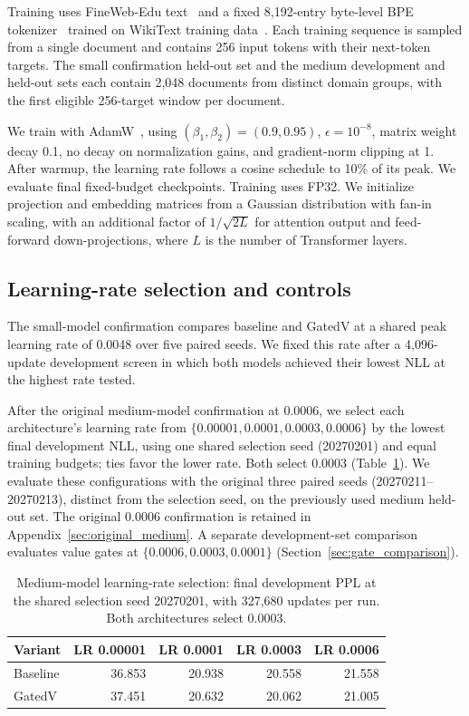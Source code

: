 \documentclass[11pt,a4paper]{article}
\begin{document}
Training uses FineWeb-Edu text~\citep{fineweb} and a fixed 8,192-entry byte-level BPE tokenizer~\citep{gpt2} trained on WikiText training data~\citep{wikitext}. Each training sequence is sampled from a single document and contains 256 input tokens with their next-token targets. The small confirmation held-out set and the medium development and held-out sets each contain 2,048 documents from distinct domain groups, with the first eligible 256-target window per document.

We train with AdamW~\citep{adamw}, using $(\beta_1,\beta_2)=(0.9,0.95)$, $\epsilon=10^{-8}$, matrix weight decay 0.1, no decay on normalization gains, and gradient-norm clipping at 1. After warmup, the learning rate follows a cosine schedule to 10\% of its peak. We evaluate final fixed-budget checkpoints. Training uses FP32. We initialize projection and embedding matrices from a Gaussian distribution with fan-in scaling, with an additional factor of $1/\sqrt{2L}$ for attention output and feed-forward down-projections, where $L$ is the number of Transformer layers.

\subsection{Learning-rate selection and controls}
The small-model confirmation compares baseline and GatedV at a shared peak learning rate of 0.0048 over five paired seeds. We fixed this rate after a 4,096-update development screen in which both models achieved their lowest NLL at the highest rate tested.

After the original medium-model confirmation at 0.0006, we select each architecture's learning rate from $\{0.00001,0.0001,0.0003,0.0006\}$ by the lowest final development NLL, using one shared selection seed (20270201) and equal training budgets; ties favor the lower rate. Both select 0.0003 (Table~\ref{tab:medium_lr}). We evaluate these configurations with the original three paired seeds (20270211--20270213), distinct from the selection seed, on the previously used medium held-out set. The original 0.0006 confirmation is retained in Appendix~\ref{sec:original_medium}. A separate development-set comparison evaluates value gates at $\{0.0006,0.0003,0.0001\}$ (Section~\ref{sec:gate_comparison}).

\begin{table}[htbp]
\centering\small
\caption{Medium-model learning-rate selection: final development PPL at the shared selection seed 20270201, with 327,680 updates per run. Both architectures select 0.0003.}
\label{tab:medium_lr}
\begin{tabular}{lrrrr}
\toprule
Variant & LR 0.00001 & LR 0.0001 & LR 0.0003 & LR 0.0006\\
\midrule
Baseline & 36.853 & 20.938 & 20.558 & 21.558\\
GatedV & 37.451 & 20.632 & 20.062 & 21.005\\
\bottomrule
\end{tabular}
\end{table}
\end{document}
